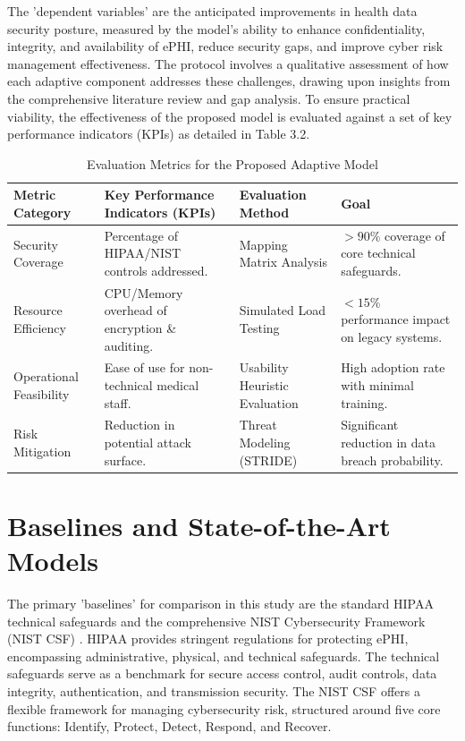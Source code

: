 \documentclass[12pt, a4paper, oneside]{report}
\begin{document}
	The 'dependent variables' are the anticipated improvements in health data security posture, measured by the model's ability to enhance confidentiality, integrity, and availability of ePHI, reduce security gaps, and improve cyber risk management effectiveness. The protocol involves a qualitative assessment of how each adaptive component addresses these challenges, drawing upon insights from the comprehensive literature review and gap analysis. To ensure practical viability, the effectiveness of the proposed model is evaluated against a set of key performance indicators (KPIs) as detailed in Table 3.2.
	
	\begin{table}[H]
		\centering
		\caption{Evaluation Metrics for the Proposed Adaptive Model}
		\label{tab:metrics2}
		\begin{tabularx}{\textwidth}{lXXX}
			\toprule
			\textbf{Metric Category} & \textbf{Key Performance Indicators (KPIs)} & \textbf{Evaluation Method} & \textbf{Goal} \\
			\midrule
			Security Coverage & Percentage of HIPAA/NIST controls addressed.&
			Mapping Matrix Analysis & 
			$>90\%$ coverage of core technical safeguards. \\
			Resource Efficiency & CPU/Memory overhead of encryption \& auditing.&
			Simulated Load Testing & $<15\%$ performance impact on legacy systems. \\
			Operational Feasibility &
			Ease of use for non-technical medical staff. &
			Usability Heuristic Evaluation &
			High adoption rate with minimal training. 
			\\
			Risk Mitigation &
			Reduction in potential attack surface. &
			Threat Modeling (STRIDE) &
			Significant reduction in data breach probability. \\
			\bottomrule
		\end{tabularx}
	\end{table}
	
	\section{Baselines and State-of-the-Art Models}	
	The primary 'baselines' for comparison in this study are the standard HIPAA technical safeguards \cite{hhs2024hipaa} and the comprehensive NIST Cybersecurity Framework (NIST CSF) \cite{rahmany2026aida}. HIPAA provides stringent regulations for protecting ePHI, encompassing administrative, physical, and technical safeguards. The technical safeguards serve as a benchmark for secure access control, audit controls, data integrity, authentication, and transmission security. The NIST CSF offers a flexible framework for managing cybersecurity risk, structured around five core functions: Identify, Protect, Detect, Respond, and Recover.

	\renewcommand{\bibname}{References}
	
	
	
\end{document}
